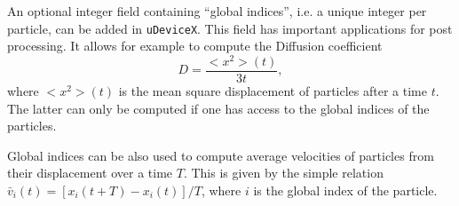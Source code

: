 An optional integer field containing ``global indices'', i.e. a unique integer per particle, can be added in \texttt{uDeviceX}. This field has important applications for post processing. It allows for example to compute the Diffusion coefficient
\[
D = \frac{<x^2>(t)}{3 t},
\]
where $<x^2>(t)$ is the mean square displacement of particles after a time $t$. The latter can only be computed if one has access to the global indices of the particles.

Global indices can be also used to compute average velocities of particles from their displacement over a time $T$. This is given by the simple relation $\bar{v}_i(t) = [x_i(t + T) - x_i(t)] / T$, where $i$ is the global index of the particle.
